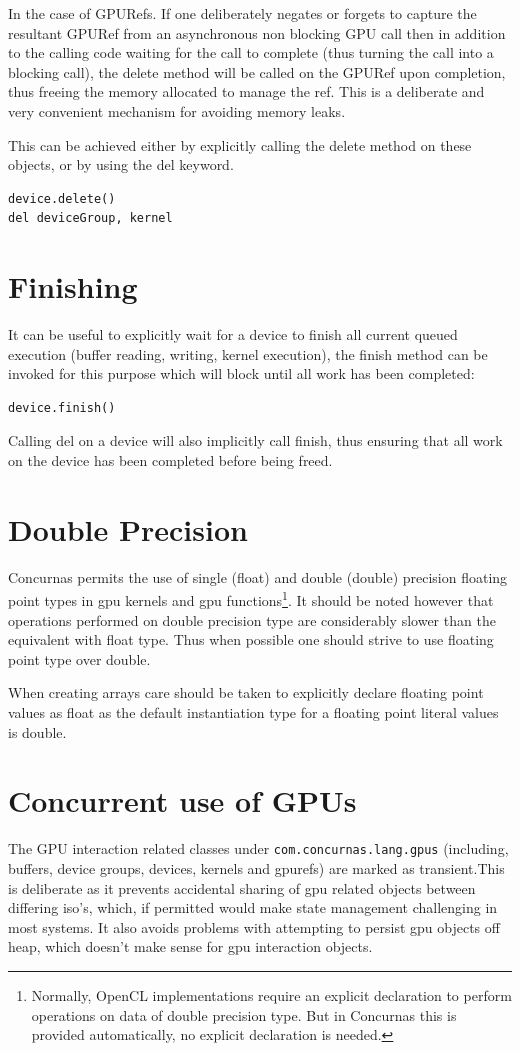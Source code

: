 \documentclass[conc-doc]{subfiles}
\begin{document}
In the case of GPURefs. If one deliberately negates or forgets to capture the resultant GPURef from an asynchronous non blocking GPU call then in addition to the calling code waiting for the call to complete (thus turning the call into a blocking call), the delete method will be called on the GPURef upon completion, thus freeing the memory allocated to manage the ref. This is a deliberate and very convenient mechanism for avoiding memory leaks.

This can be achieved either by explicitly calling the delete method on these objects, or by using the del keyword.
\begin{lstlisting}
device.delete()
del deviceGroup, kernel
\end{lstlisting}

\section{Finishing}
It can be useful to explicitly wait for a device to finish all current queued execution (buffer reading, writing, kernel execution), the finish method can be invoked for this purpose which will block until all work has been completed:
\begin{lstlisting}
device.finish()
\end{lstlisting}

Calling del on a device will also implicitly call finish, thus ensuring that all work on the device has been completed before being freed.

\section{Double Precision}
Concurnas permits the use of single (float) and double (double) precision floating point types in gpu kernels and gpu functions\footnote{Normally, OpenCL implementations require an explicit declaration to perform operations on data of double precision type. But in Concurnas this is provided automatically, no explicit declaration is needed.}. It should be noted however that operations  performed on double precision type are considerably slower than the equivalent with float type. Thus when possible one should strive to use floating point type over double.

When creating arrays care should be taken to explicitly declare floating point values as float as the default instantiation type for a floating point literal values is double.

\section{Concurrent use of GPUs}
The GPU interaction related classes under \lstinline{com.concurnas.lang.gpus} (including, buffers, device groups, devices, kernels and gpurefs) are marked as transient.This is deliberate as it prevents accidental sharing of gpu related objects between differing iso's, which, if permitted would make state management challenging in most systems. It also avoids problems with attempting to persist gpu objects off heap, which doesn't make sense for gpu interaction objects.
\end{document}
